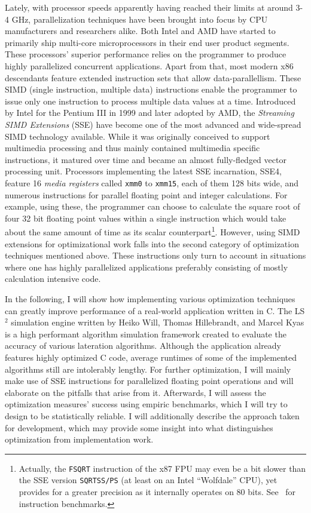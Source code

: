 Lately, with processor speeds apparently having reached their limits at around 3-4 GHz, parallelization techniques have been brought into focus by CPU manufacturers and researchers alike. Both Intel and AMD have started to primarily ship multi-core microprocessors in their end user product segments. These processors' superior performance relies on the programmer to produce highly parallelized concurrent applications. Apart from that, most modern x86 descendants feature extended instruction sets that allow data-parallellism. These SIMD (single instruction, multiple data) instructions enable the programmer to issue only one instruction to process multiple data values at a time. Introduced by Intel for the Pentium III in 1999 and later adopted by AMD, the \emph{Streaming SIMD Extensions} (SSE) have become one of the most advanced and wide-spread SIMD technology available. While it was originally conceived to support multimedia processing and thus mainly contained multimedia specific instructions, it matured over time and became an almost fully-fledged vector processing unit. Processors implementing the latest SSE incarnation, SSE4, feature 16 \emph{media registers} called \texttt{xmm0} to \texttt{xmm15}, each of them 128 bits wide, and numerous instructions for parallel floating point and integer calculations. For example, using these, the programmer can choose to calculate the square root of four 32 bit floating point values within a single instruction which would take about the same amount of time as its scalar counterpart\footnote{Actually, the \texttt{FSQRT} instruction of the x87 FPU may even be a bit slower than the SSE version \texttt{SQRTSS/PS} (at least on an Intel ``Wolfdale'' CPU), yet provides for a greater precision as it internally operates on 80 bits. See~\cite{fog2011instructiontables} for instruction benchmarks.}. However, using SIMD extensions for optimizational work falls into the second category of optimization techniques mentioned above. These instructions only turn to account in situations where one has highly parallelized applications preferably consisting of mostly calculation intensive code.

In the following, I will show how implementing various optimization techniques can greatly improve performance of a real-world application written in C. The LS$^{2}$ simulation engine written by Heiko Will, Thomas Hillebrandt, and Marcel Kyas is a high performant algorithm simulation framework created to evaluate the accuracy of various lateration algorithms. Although the application already features highly optimized C code, average runtimes of some of the implemented algorithms still are intolerably lengthy. For further optimization, I will mainly make use of SSE instructions for parallelized floating point operations and will elaborate on the pitfalls that arise from it. Afterwards, I will assess the optimization measures' success using empiric benchmarks, which I will try to design to be statistically reliable. I will additionally describe the approach taken for development, which may provide some insight into what distinguishes optimization from implementation work.

